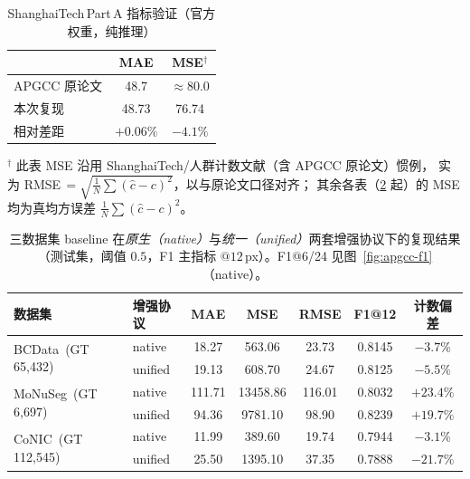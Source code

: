 \begin{enumerate}
    \begin{table}[H]
    \centering
    \caption{ShanghaiTech\,Part\,A 指标验证（官方权重，纯推理）}
    \label{tab:apgcc-shha}
    \begin{tabular}{lcc}
    \toprule
    & MAE & MSE$^\dagger$ \\
    \midrule
    APGCC 原论文 & 48.7 & $\approx 80.0$ \\
    本次复现     & 48.73 & 76.74 \\
    相对差距     & $+0.06\%$ & $-4.1\%$ \\
    \bottomrule
    \end{tabular}

    \vspace{2pt}
    {\footnotesize $^\dagger$ 此表 MSE 沿用 ShanghaiTech/人群计数文献（含 APGCC 原论文）惯例，
    实为 RMSE\,$=\sqrt{\frac1N\sum(\hat c-c)^2}$，以与原论文口径对齐；
    其余各表（\ref{tab:apgcc-cell} 起）的 MSE 均为真均方误差 $\frac1N\sum(\hat c-c)^2$。}
    \end{table}

    \begin{table}[H]
    \centering
    \caption{三数据集 baseline 在\emph{原生（native）}与\emph{统一（unified）}两套增强协议下的复现结果
    （测试集，阈值 $0.5$，F1 主指标 $@12$\,px）。F1@6/24 见图~\ref{fig:apgcc-f1}（native）。}
    \label{tab:apgcc-cell}
    \begin{tabular}{llccccc}
    \toprule
    数据集 & 增强协议 & MAE & MSE & RMSE & F1@12 & 计数偏差 \\
    \midrule
    \multirow{2}{*}{BCData\ (GT 65{,}432)}
            & native  & 18.27  & 563.06   & 23.73  & 0.8145 & $-3.7\%$ \\
            & unified & 19.13  & 608.70   & 24.67  & 0.8125 & $-5.5\%$ \\
    \midrule
    \multirow{2}{*}{MoNuSeg\ (GT 6{,}697)}
            & native  & 111.71 & 13458.86 & 116.01 & 0.8032 & $+23.4\%$ \\
            & unified & 94.36  & 9781.10  & 98.90  & 0.8239 & $+19.7\%$ \\
    \midrule
    \multirow{2}{*}{CoNIC\ (GT 112{,}545)}
            & native  & 11.99  & 389.60   & 19.74  & 0.7944 & $-3.1\%$ \\
            & unified & 25.50  & 1395.10  & 37.35  & 0.7888 & $-21.7\%$ \\
    \bottomrule
    \end{tabular}
    \end{table}


\end{enumerate}
